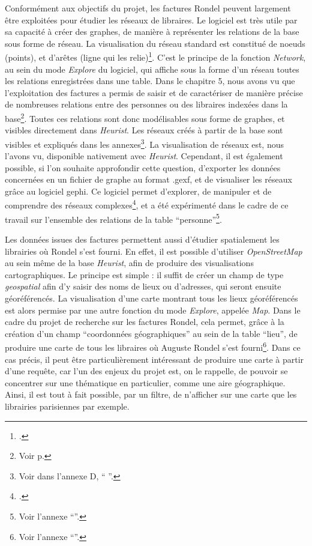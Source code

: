 Conformément aux objectifs du projet, les factures Rondel peuvent largement être exploitées pour étudier les réseaux de libraires. Le logiciel est très utile par sa capacité à créer des graphes, de manière à représenter les relations de la base sous forme de réseau. La visualisation du réseau standard est constitué de noeuds (points), et d'arêtes (ligne qui les relie)\footcite[p. 189]{Drucker_2020}. C'est le principe de la fonction \emph{Network}, au sein du mode \emph{Explore} du logiciel, qui affiche sous la forme d'un réseau toutes les relations enregistrées dans une table. Dans le chapitre 5, nous avons vu que l'exploitation des factures a permis de saisir et de caractériser de manière précise de nombreuses relations entre des personnes ou des libraires indexées dans la base\footnote{Voir p.\pageref{conception base}}. Toutes ces relations sont donc modélisables sous forme de graphes, et visibles directement dans \emph{Heurist}. Les réseaux créés à partir de la base sont visibles et expliqués dans les annexes\footnote{Voir dans l'annexe D, \enquote{ }.}. 
La visualisation de réseaux est, nous l'avons vu, disponible nativement avec \emph{Heurist}. Cependant, il est également possible, si l'on souhaite approfondir cette question, d'exporter les données concernées en un fichier de graphe au format .gexf, et de visualiser les réseaux grâce au logiciel gephi. Ce logiciel permet d'explorer, de manipuler et de comprendre des réseaux complexes\footcite{noauthor_gephi_nodate}, et a été expérimenté dans le cadre de ce travail sur l'ensemble des relations de la table \enquote{personne}\footnote{Voir l'annexe \enquote{}.}.


Les données issues des factures permettent aussi d'étudier spatialement les librairies où Rondel s'est fourni. En effet, il est possible d'utiliser \emph{OpenStreetMap} au sein même de la base \emph{Heurist}, afin de produire des visualisations cartographiques. Le principe est simple : il suffit de créer un champ de type \emph{geospatial} afin d'y saisir des noms de lieux ou d'adresses, qui seront ensuite géoréférencés. La visualisation d'une carte montrant tous les lieux géoréférencés est alors permise par une autre fonction du mode \emph{Explore}, appelée \emph{Map}. Dans le cadre du projet de recherche sur les factures Rondel, cela permet, grâce à la création d'un champ \enquote{coordonnées géographiques} au sein de la table \enquote{lieu}, de produire une carte de tous les libraires où Auguste Rondel s'est fourni\footnote{Voir l'annexe \enquote{}.}. Dans ce cas précis, il peut être particulièrement intéressant de produire une carte à partir d'une requête, car l'un des enjeux du projet est, on le rappelle, de pouvoir se concentrer sur une thématique en particulier, comme une aire géographique. Ainsi, il est tout à fait possible, par un filtre, de n'afficher sur une carte que les librairies parisiennes par exemple. 

